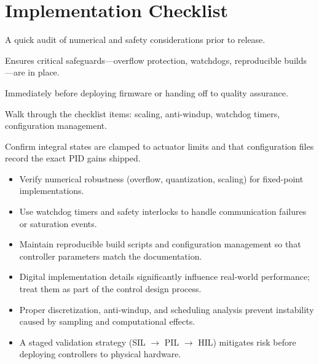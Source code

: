 \section{Implementation Checklist}
\begin{beginnerguide}
    \item[\textbf{What?}] A quick audit of numerical and safety considerations prior to release.
    \item[\textbf{Why?}] Ensures critical safeguards—overflow protection, watchdogs, reproducible builds—are in place.
    \item[\textbf{When?}] Immediately before deploying firmware or handing off to quality assurance.
    \item[\textbf{How?}] Walk through the checklist items: scaling, anti-windup, watchdog timers, configuration management.
    \item[\textbf{Example}] Confirm integral states are clamped to actuator limits and that configuration files record the exact PID gains shipped.
\end{beginnerguide}
\begin{itemize}[leftmargin=*]
    \item Verify numerical robustness (overflow, quantization, scaling) for fixed-point implementations.
    \item Use watchdog timers and safety interlocks to handle communication failures or saturation events.
    \item Maintain reproducible build scripts and configuration management so that controller parameters match the documentation.
\end{itemize}

\begin{takeaway}
\begin{itemize}[leftmargin=*]
    \item Digital implementation details significantly influence real-world performance; treat them as part of the control design process.
    \item Proper discretization, anti-windup, and scheduling analysis prevent instability caused by sampling and computational effects.
    \item A staged validation strategy (SIL $\rightarrow$ PIL $\rightarrow$ HIL) mitigates risk before deploying controllers to physical hardware.
\end{itemize}
\end{takeaway}


